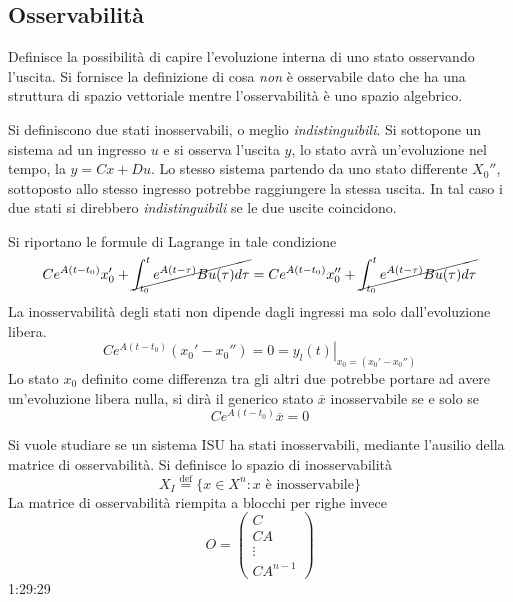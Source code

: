 \subsection{Osservabilità}
Definisce la possibilità di capire l'evoluzione interna di uno stato osservando
l'uscita.
Si fornisce la definizione di cosa \textit{non} è osservabile dato che ha una
struttura di spazio vettoriale mentre l'osservabilità è uno spazio
algebrico.

Si definiscono due stati inosservabili, o meglio \textit{indistinguibili}.
Si sottopone un sistema ad un ingresso $u$ e si osserva l'uscita $y$, lo stato
avrà un'evoluzione nel tempo, la $y=Cx+Du$.
Lo stesso sistema partendo da uno stato differente $X_0''$, sottoposto allo
stesso ingresso potrebbe raggiungere la stessa uscita. In tal caso i due stati
si direbbero \textit{indistinguibili} se le due uscite coincidono.

Si riportano le formule di Lagrange in tale condizione
$$
Ce^{A(t-t_0)}x_0' + \cancel{\int_{t_0}^t e^{A(t-\tau)}Bu(\tau)d\tau} =
Ce^{A(t-t_0)}x_0'' + \cancel{\int_{t_0}^t e^{A(t-\tau)}Bu(\tau)d\tau}
$$
La inosservabilità degli stati non dipende dagli ingressi ma solo
dall'evoluzione libera.
$$
Ce^{A(t-t_0)}(x_0'-x_0'') = 0 = \left.y_l(t)
\right|_{x_0=(x_0'-x_0'')}
$$
Lo stato $x_0$ definito come differenza tra gli altri due potrebbe portare ad
avere un'evoluzione libera nulla, si dirà il generico stato $\overline{x}$
inosservabile se e solo se
$$
Ce^{A(t-t_0)}\overline{x}=0
$$

Si vuole studiare se un sistema ISU ha stati inosservabili, mediante l'ausilio
della matrice di osservabilità.
Si definisce lo spazio di inosservabilità
$$
X_I \stackrel{\text{def}}{=}\{x\in X^n:x\text{ è inosservabile}\}
$$
La matrice di osservabilità riempita a blocchi per righe invece
$$
O = \begin{pmatrix}
C \\ CA \\ \vdots \\CA^{n-1}
\end{pmatrix}
$$
1:29:29
